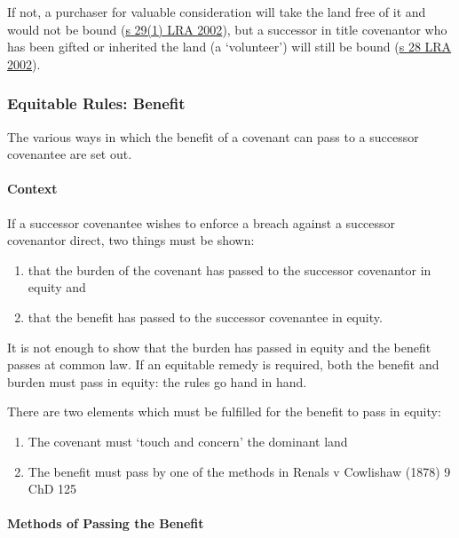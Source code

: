 \documentclass[
]{article}
\providecommand{\tightlist}{%
  \setlength{\itemsep}{0pt}\setlength{\parskip}{0pt}}
\begin{document}
If not, a purchaser for valuable consideration will take the land free
of it and would not be bound
(\href{https://www.legislation.gov.uk/ukpga/2002/9/section/29}{s 29(1)
LRA 2002}), but a successor in title covenantor who has been gifted or
inherited the land (a `volunteer') will still be bound
(\href{https://www.legislation.gov.uk/ukpga/2002/9/section/28}{s 28 LRA
2002}).

\hypertarget{equitable-rules-benefit}{%
\subsubsection{Equitable Rules: Benefit}\label{equitable-rules-benefit}}

The various ways in which the benefit of a covenant can pass to a
successor covenantee are set out.

\hypertarget{context-1}{%
\paragraph{Context}\label{context-1}}

If a successor covenantee wishes to enforce a breach against a successor
covenantor direct, two things must be shown:

\begin{enumerate}
\tightlist
\item
  that the burden of the covenant has passed to the successor covenantor
  in equity and
\item
  that the benefit has passed to the successor covenantee in equity.
\end{enumerate}

It is not enough to show that the burden has passed in equity and the
benefit passes at common law. If an equitable remedy is required, both
the benefit and burden must pass in equity: the rules go hand in hand.

There are two elements which must be fulfilled for the benefit to pass
in equity:

\begin{enumerate}
\tightlist
\item
  The covenant must `touch and concern' the dominant land
\item
  The benefit must pass by one of the methods in Renals v Cowlishaw
  (1878) 9 ChD 125
\end{enumerate}

\hypertarget{methods-of-passing-the-benefit}{%
\paragraph{Methods of Passing the
Benefit}\label{methods-of-passing-the-benefit}}
\end{document}

